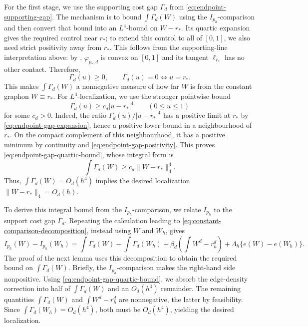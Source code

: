 For the first stage, we use the supporting cost gap $\Gamma_d$ from
\eqref{eq:endpoint-supporting-gap}.  The mechanism is to bound
$\int\Gamma_d(W)$ using the $I_{p_h}$-comparison and then convert that bound
into an $L^4$-bound on $W-r_*$.  Its quartic expansion gives the required
control near $r_*$; to extend this control to all of $[0,1]$, we also need
strict positivity away from $r_*$.  This follows from the supporting-line
interpretation above: by , $\varphi_{p_*,d}$ is
convex on $[0,1]$ and its tangent $\ell_{r_*}$ has no other contact.
Therefore,
\begin{equation}\label{eq:endpoint-gap-positivity}
  \Gamma_d(u)\ge0,
  \qquad
  \Gamma_d(u)=0\iff u=r_*.
\end{equation}
This makes $\int\Gamma_d(W)$ a nonnegative measure of how far $W$ is from
the constant graphon $W\equiv r_*$.  For $L^4$-localization, we use the
stronger pointwise bound
\begin{equation}\label{eq:endpoint-gap-quartic-bound}
  \Gamma_d(u)\ge c_d|u-r_*|^4
  \qquad(0\le u\le1)
\end{equation}
for some $c_d>0$.  Indeed, the ratio $\Gamma_d(u)/|u-r_*|^4$ has a positive
limit at $r_*$ by \eqref{eq:endpoint-gap-expansion}, hence a
positive lower bound in a neighbourhood of $r_*$.  On the compact complement
of this neighbourhood, it has a positive minimum by continuity and
\eqref{eq:endpoint-gap-positivity}.  This proves
\eqref{eq:endpoint-gap-quartic-bound}, whose integral form is
\[
  \int\Gamma_d(W)\ge c_d\|W-r_*\|_4^4.
\]
Thus, $\int\Gamma_d(W)=O_d(h^4)$ implies the desired localization
$\|W-r_*\|_4=O_d(h)$.

To derive this integral bound from the $I_{p_h}$-comparison, we relate
$I_{p_h}$ to the support cost gap $\Gamma_d$.  Repeating the calculation leading to
\eqref{eq:constant-comparison-decomposition}, instead using $W$ and $W_h$, gives
\begin{equation}\label{eq:graphon-cost-decomposition}
  I_{p_h}(W)-I_{p_h}(W_h)
  =\int\Gamma_d(W)-\int\Gamma_d(W_h)
  +\beta_d\left(\int W^d-r_h^d\right)
  +\Lambda_h\{e(W)-e(W_h)\}.
\end{equation}
The proof of the next lemma uses this decomposition to obtain the required
bound on $\int\Gamma_d(W)$.
Briefly, the $I_{p_h}$-comparison makes the right-hand side nonpositive.
Using \eqref{eq:endpoint-gap-quartic-bound}, we absorb the edge-density
correction into half of $\int\Gamma_d(W)$ and an $O_d(h^4)$ remainder.
The remaining quantities $\int\Gamma_d(W)$ and $\int W^d-r_h^d$ are
nonnegative, the latter by feasibility.  Since $\int\Gamma_d(W_h)=O_d(h^4)$,
both must be $O_d(h^4)$, yielding the desired localization.

